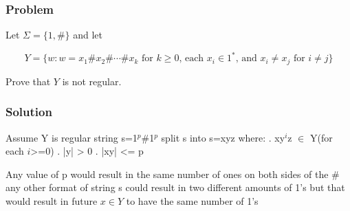 \documentclass{article}
\begin{document}
\begin{empfile}
\subsubsection*{Problem}

Let $\Sigma=\{1,\#\}$ and let

$$ Y=\{w:w=x_1\#x_2\#\cdots\#x_k\text{ for }k\geq0\text{, each }x_i\in1^*\text{, and }x_i\neq x_j\text{ for }i\neq j\} $$

Prove that $Y$ is not regular.

\subsubsection*{Solution}

Assume Y is regular \newline
string s=1$^p$\#1$^p$ \newline
split s into s=xyz where: . xy$^i$z $\in$ Y(for each $i$>=0) . |y| > 0 . |xy| <= p \newline

Any value of p would result in the same number of ones on both sides of the \# 
any other format of string s could result in two different amounts of 1's but that 
would result in future $x \in Y$ to have the same number of 1's



\end{empfile}
\immediate{}
\end{document}
